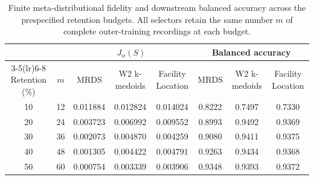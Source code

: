 \begin{table}[t]
\centering
\caption{Finite meta-distributional fidelity and downstream balanced accuracy
across the prespecified retention budgets. All selectors retain the same number
$m$ of complete outer-training recordings at each budget.}
\small
\begin{tabular*}{\textwidth}{@{\extracolsep{\fill}}cccccccc@{}}
\toprule
& & \multicolumn{3}{c}{$J_\alpha(S)$} & \multicolumn{3}{c}{Balanced accuracy} \\
\cmidrule(lr){3-5}\cmidrule(lr){6-8}
Retention (\%) & $m$ & MRDS & W2 k-medoids & Facility Location
& MRDS & W2 k-medoids & Facility Location \\
\midrule
10 & 12 & 0.011884 & 0.012824 & 0.014024 & 0.8222 & 0.7497 & 0.7330 \\
20 & 24 & 0.003723 & 0.006992 & 0.009552 & 0.8993 & 0.9492 & 0.9369 \\
30 & 36 & 0.002073 & 0.004870 & 0.004259 & 0.9080 & 0.9411 & 0.9375 \\
40 & 48 & 0.001305 & 0.004422 & 0.004791 & 0.9263 & 0.9434 & 0.9368 \\
50 & 60 & 0.000754 & 0.003339 & 0.003906 & 0.9348 & 0.9393 & 0.9372 \\
\bottomrule
\end{tabular*}
\end{table}
